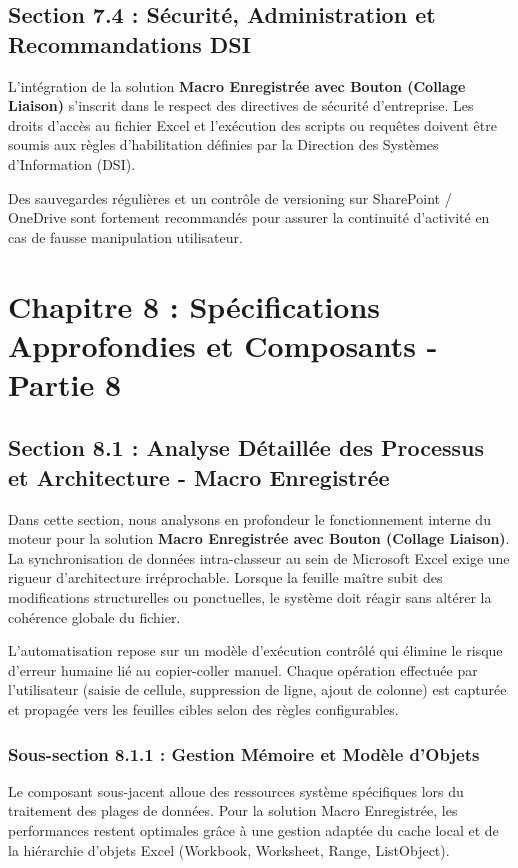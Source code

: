 \documentclass[12pt,a4paper]{report}
\begin{document}
\section{Section 7.4 : Sécurité, Administration et Recommandations DSI}
L'intégration de la solution \textbf{Macro Enregistrée avec Bouton (Collage Liaison)} s'inscrit dans le respect des directives de sécurité d'entreprise. Les droits d'accès au fichier Excel et l'exécution des scripts ou requêtes doivent être soumis aux règles d'habilitation définies par la Direction des Systèmes d'Information (DSI).

Des sauvegardes régulières et un contrôle de versioning sur SharePoint / OneDrive sont fortement recommandés pour assurer la continuité d'activité en cas de fausse manipulation utilisateur.


\chapter{Chapitre 8 : Spécifications Approfondies et Composants - Partie 8}

\section{Section 8.1 : Analyse Détaillée des Processus et Architecture - Macro Enregistrée}
Dans cette section, nous analysons en profondeur le fonctionnement interne du moteur pour la solution \textbf{Macro Enregistrée avec Bouton (Collage Liaison)}. La synchronisation de données intra-classeur au sein de Microsoft Excel exige une rigueur d'architecture irréprochable. Lorsque la feuille maître subit des modifications structurelles ou ponctuelles, le système doit réagir sans altérer la cohérence globale du fichier.

L'automatisation repose sur un modèle d'exécution contrôlé qui élimine le risque d'erreur humaine lié au copier-coller manuel. Chaque opération effectuée par l'utilisateur (saisie de cellule, suppression de ligne, ajout de colonne) est capturée et propagée vers les feuilles cibles selon des règles configurables.


\subsection{Sous-section 8.1.1 : Gestion Mémoire et Modèle d'Objets}
Le composant sous-jacent alloue des ressources système spécifiques lors du traitement des plages de données. Pour la solution Macro Enregistrée, les performances restent optimales grâce à une gestion adaptée du cache local et de la hiérarchie d'objets Excel (Workbook, Worksheet, Range, ListObject).
\end{document}
